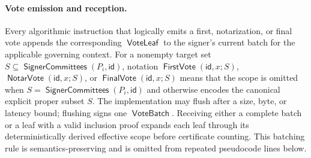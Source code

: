\documentclass[sigplan,twocolumn,review,anonymous]{acmart}
\newcommand{\func}[1]{\operatorname{\mathsf{#1}}}
\newcommand{\NotarVote}{\func{NotarVote}}
\newcommand{\FirstVote}{\func{FirstVote}}
\newcommand{\FinalVote}{\func{FinalVote}}
\newcommand{\id}{\mathsf{id}}
\newcommand{\VoteBatch}{\func{VoteBatch}}
\newcommand{\VoteLeaf}{\func{VoteLeaf}}
\newcommand{\SignerCommittees}{\func{SignerCommittees}}
\begin{document}
\paragraph{Vote emission and reception.}
Every algorithmic instruction that logically emits a first, notarization, or final vote appends the
corresponding \(\VoteLeaf\) to the signer's current batch for the applicable governing context.  For a
nonempty target set \(S\subseteq\SignerCommittees(P_i,\id)\), notation
\(\FirstVote(\id,x;S)\), \(\NotarVote(\id,x;S)\), or \(\FinalVote(\id,x;S)\) means that the scope
is omitted when \(S=\SignerCommittees(P_i,\id)\) and otherwise encodes the canonical explicit proper
subset \(S\).  The implementation may flush after a size, byte, or latency bound; flushing signs one
\(\VoteBatch\).  Receiving either a complete batch or a leaf with a valid inclusion proof expands each
leaf through its deterministically derived effective scope before certificate counting.  This batching
rule is semantics-preserving and is omitted from repeated pseudocode lines below.
\end{document}
